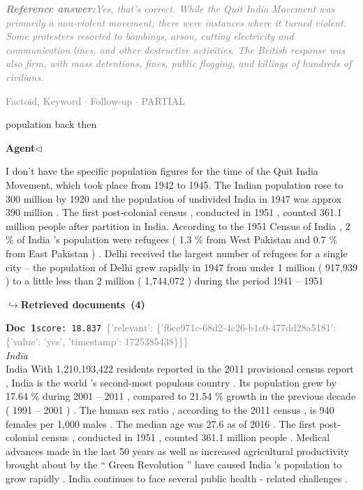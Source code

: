 \documentclass[a4paper,11pt]{article}
\begin{document}
\begin{refanswerenv}
{\footnotesize\textit{\textcolor{gray}{\textbf{Reference answer:}\enspace Yes, that's correct. While the Quit India Movement was primarily a non-violent movement, there were instances where it turned violent. Some protesters resorted to bombings, arson, cutting electricity and communication lines, and other destructive activities. The British response was also firm, with mass detentions, fines, public flogging, and killings of hundreds of civilians.}}}
\end{refanswerenv}
\vspace{0.5em}
\hfill{\tiny\textcolor{gray}{Factoid, Keyword $\cdot$ Follow-up $\cdot$ PARTIAL}}
\begin{userbubble}
population back then
\end{userbubble}
\noindent\hfill{\small\textcolor{agentcolor}{\textbf{Agent\enspace$\triangleleft$}}}
\begin{agentbubble}
I don't have the specific population figures for the time of the Quit India Movement, which took place from 1942 to 1945.  The Indian population rose to 300 million by 1920 and the population of undivided India in 1947 was approx 390 million .  The first post-colonial census , conducted in 1951 , counted 361.1 million people after partition in India. According to the 1951 Census of India , 2 \% of India 's population were refugees ( 1.3 \% from West Pakistan and 0.7 \% from East Pakistan ) . Delhi received the largest number of refugees for a single city -- the population of Delhi grew rapidly in 1947 from under 1 million ( 917,939 ) to a little less than 2 million ( 1,744,072 ) during the period 1941 -- 1951 
\end{agentbubble}
\noindent\hfill{\footnotesize\textcolor{doccolor}{\textbf{$\hookrightarrow$\enspace Retrieved documents~(4)}}}
\begin{docenv}
{\footnotesize\textcolor{doccolor}{\textbf{Doc~1}}}\hfill{\tiny\texttt{score:~18.837}}\ {\tiny\textcolor{gray}{\{'relevant': \{'f6ce971c-68d2-4c26-b1c0-477dd28a5181': \{'value': 'yes', 'timestamp': 1725385438\}\}\}}}\\[3pt]
{\small\textit{India}}\\[2pt]
\vspace{2pt}
{\footnotesize India
With 1,210,193,422 residents reported in the 2011 provisional census report , India is the world 's second-most populous country . Its population grew by 17.64 \% during 2001 -- 2011 , compared to 21.54 \% growth in the previous decade ( 1991 -- 2001 ) . The human sex ratio , according to the 2011 census , is 940 females per 1,000 males . The median age was 27.6 as of 2016 . The first post-colonial census , conducted in 1951 , counted 361.1 million people . Medical advances made in the last 50 years as well as increased agricultural productivity brought about by the `` Green Revolution '' have caused India 's population to grow rapidly . India continues to face several public health - related challenges .}
\end{docenv}
\end{document}
